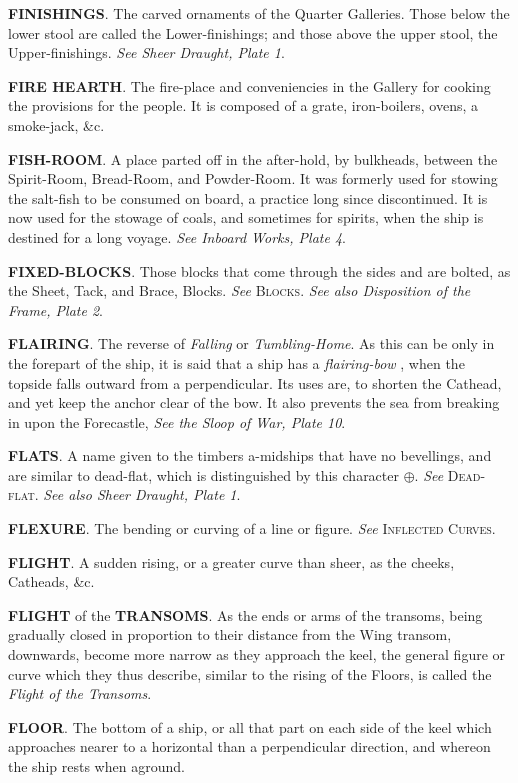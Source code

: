 \textbf{FINISHINGS}. The carved ornaments of the Quarter Galleries. Those below the lower stool are called the Lower-finishings; and those above the upper stool, the Upper-finishings. \textit{See Sheer Draught, Plate 1}. 

\textbf{FIRE HEARTH}. The fire-place and conveniencies in the Gallery for cooking the provisions for the people. It is composed of a grate, iron-boilers, ovens, a smoke-jack, \&c. 

\textbf{FISH-ROOM}. A place parted off in the after-hold, by bulkheads, between the Spirit-Room, Bread-Room, and Powder-Room. It was formerly used for stowing the salt-fish to be consumed on board, a practice long since discontinued. It is now used for the stowage of coals, and sometimes for spirits, when the ship is destined for a long voyage. \textit{See Inboard Works, Plate 4}. 

\textbf{FIXED-BLOCKS}. Those blocks that come through the sides and are bolted, as the Sheet, Tack, and Brace, Blocks. \textit{See} \textsc{Blocks}. \textit{See also Disposition of the Frame, Plate 2}. 

\textbf{FLAIRING}. The reverse of \textit{Falling} or \textit{Tumbling-Home}. As this can be only in the forepart of the ship, it is said that a ship has a \textit{flairing-bow} , when the topside falls outward from a perpendicular. Its uses are, to shorten the Cathead, and yet keep the anchor clear of the bow. It also prevents the sea from breaking in upon the Forecastle, \textit{See the Sloop of War, Plate 10}.

\textbf{FLATS}. A name given to the timbers a-midships that have no bevellings, and are similar to dead-flat, which is distinguished by this character $\oplus$. \textit{See} \textsc{Dead-flat}. \textit{See also Sheer Draught, Plate 1}. 

\textbf{FLEXURE}. The bending or curving of a line or figure. \textit{See} \textsc{Inflected Curves}. 

\textbf{FLIGHT}. A sudden rising, or a greater curve than sheer, as the cheeks, Catheads, \&c.

\textbf{FLIGHT} of the \textbf{TRANSOMS}. As the ends or arms of the transoms, being gradually closed in proportion to their distance from the Wing transom, downwards, become more narrow as they approach the keel, the general figure or curve which they thus describe, similar to the rising of the Floors, is called the \textit{Flight of the Transoms}. 

\textbf{FLOOR}. The bottom of a ship, or all that part on each side of the keel which approaches nearer to a horizontal than a perpendicular direction, and whereon the ship rests when aground. 

